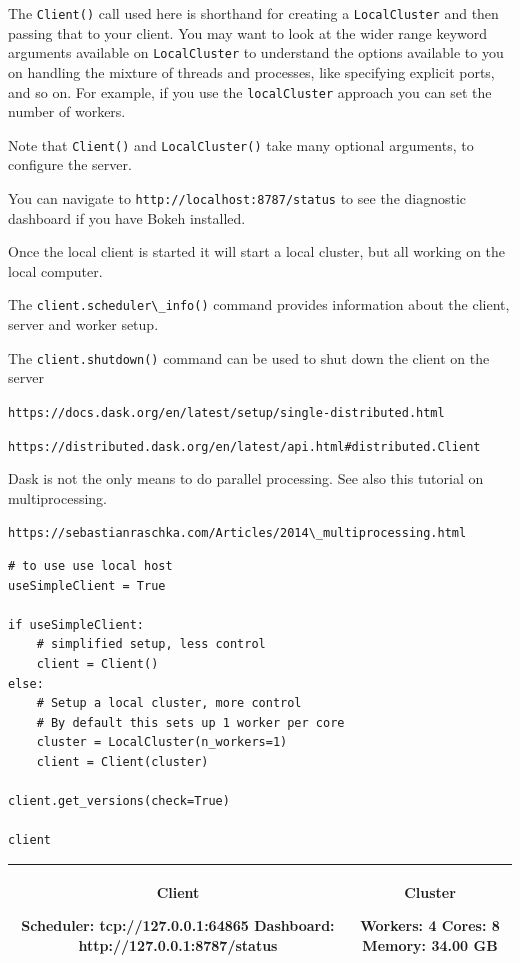 The \verb+Client()+ call used here  is shorthand for creating a \verb+LocalCluster+ and then passing that to your client.
You may want to look at the wider range  keyword arguments available on \verb+LocalCluster+ to understand the options available to you on handling the mixture of threads and processes, like specifying explicit ports, and so on. For example, if you use the \verb+localCluster+ approach you can set the number of workers.


Note that \verb+Client()+ and \verb+LocalCluster()+ take many optional arguments, to configure the server.


You can navigate to \verb+http://localhost:8787/status+ to see the diagnostic dashboard if you have Bokeh installed.


Once the local client is started it will start a local cluster, but all working on the local computer.


The \verb+client.scheduler\_info()+ command provides information about the client, server and worker setup.


The \verb+client.shutdown()+ command can be used to shut down the client on the server


\lstinline{https://docs.dask.org/en/latest/setup/single-distributed.html }


\lstinline{https://distributed.dask.org/en/latest/api.html#distributed.Client}


Dask is not the only means to do parallel processing.  See also this tutorial on multiprocessing.


\lstinline{https://sebastianraschka.com/Articles/2014\_multiprocessing.html}



\begin{lstlisting}[style=incellstyle]
# to use use local host
useSimpleClient = True

if useSimpleClient:
    # simplified setup, less control
    client = Client() 
else:
    # Setup a local cluster, more control
    # By default this sets up 1 worker per core    
    cluster = LocalCluster(n_workers=1)
    client = Client(cluster)

client.get_versions(check=True)

client
\end{lstlisting}

\begin{center}

\begin{normalsize}

\begin{tabular}{|c|c|}
\hline
Client

  Scheduler: tcp://127.0.0.1:64865
  Dashboard: http://127.0.0.1:8787/status&Cluster

  Workers: 4
  Cores: 8
  Memory: 34.00 GB\\\hline

\end{tabular}
\end{normalsize}
\end{center}


